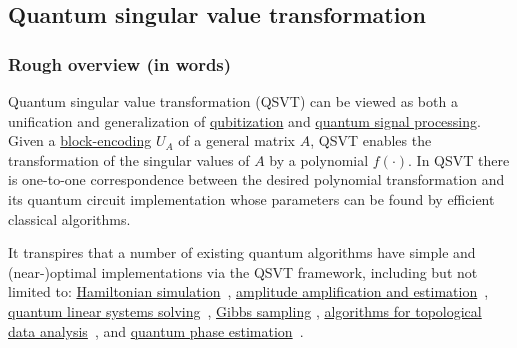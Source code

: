 \newpage








\begin{refsection}

\subsection{Quantum singular value transformation}\label{prim:QSVT}

\subsubsection*{Rough overview (in words)}
Quantum singular value transformation (QSVT) can be viewed as both a unification and generalization of \hyperref[prim:Qubitization]{qubitization} and \hyperref[prim:QSP]{quantum signal processing}. Given a \hyperref[prim:BlockEncodings]{block-encoding} $U_A$ of a general matrix $A$, QSVT enables the transformation of the singular values of $A$ by a polynomial $f(\cdot)$.
In QSVT there is one-to-one correspondence between the desired polynomial transformation and its quantum circuit implementation whose parameters can be found by efficient classical algorithms.

It transpires that a number of existing quantum algorithms have simple and (near-)optimal implementations via the QSVT framework, including but not limited to: \hyperref[prim:QSPqubitization]{Hamiltonian simulation}~\cite{low2016HamSimQSignProc,low2016HamSimQubitization,gilyen2018QSingValTransf}, \hyperref[prim:AA]{amplitude amplification and estimation}~\cite{gilyen2018QSingValTransf,rall2022amplitude}, \hyperref[prim:QuantumLinearSystemSolvers]{quantum linear systems solving}~\cite{gilyen2018QSingValTransf,martyn2021GrandUnificationQAlgs}, \hyperref[prim:GibbsSampling]{Gibbs sampling} \cite{gilyen2018QSingValTransf}, \hyperref[appl:TDA]{algorithms for topological data analysis}~\cite{hayakawa2021persistentBetti,mcardle2022streamlinedTDA, berry2022quantifyingTDA}, and \hyperref[prim:QPE]{quantum phase estimation}~\cite{martyn2021GrandUnificationQAlgs,Rall2021fastercoherent}.




\end{refsection}
